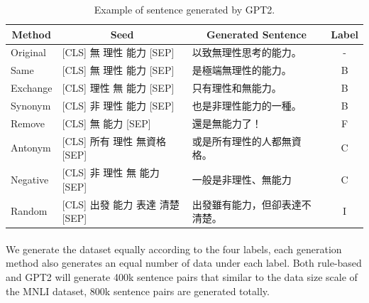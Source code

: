 \documentclass[12pt]{article}
\begin{document}
\begin{CJK*}{UTF8}{bkai}
\begin{spacing}{1.77}
\begin{table}
  \centering
  \begin{tabular}{|l|l|l|c|}
  \hline
  \multicolumn{1}{|c|}{Method} & \multicolumn{1}{c|}{Seed} & \multicolumn{1}{c|}{Generated Sentence} & Label \\ \hline
  Original & {[}CLS{]} 無 理性 能力 {[}SEP{]} & 以致無理性思考的能力。 & - \\ \hline
  Same & {[}CLS{]} 無 理性 能力 {[}SEP{]} & 是極端無理性的能力。 & B \\ \hline
  Exchange & {[}CLS{]} 理性 無 能力 {[}SEP{]} & 只有理性和無能力。 & B \\ \hline
  Synonym & {[}CLS{]} 非 理性 能力 {[}SEP{]} & 也是非理性能力的一種。 & B \\ \hline
  Remove & {[}CLS{]} 無 能力 {[}SEP{]} & 還是無能力了！ & F \\ \hline
  Antonym & {[}CLS{]} 所有 理性 無資格 {[}SEP{]} & 或是所有理性的人都無資格。 & C \\ \hline
  Negative & {[}CLS{]} 非 理性 無 能力 {[}SEP{]} & 一般是非理性、無能力 & C \\ \hline
  Random & {[}CLS{]} 出發 能力 表達 清楚 {[}SEP{]} & 出發雖有能力，但卻表達不清楚。 & I \\ \hline
  \end{tabular}
  \caption{Example of sentence generated by GPT2.}
  \label{example:gpt2_pseudo}
\end{table}

\paragraph{}
We generate the dataset equally according to the four labels, each generation method also generates an equal number of data under each label. Both rule-based and GPT2 will generate 400k sentence pairs that similar to the data size scale of the MNLI dataset, 800k sentence pairs are generated totally.


\end{spacing}
\end{CJK*}
\end{document}
